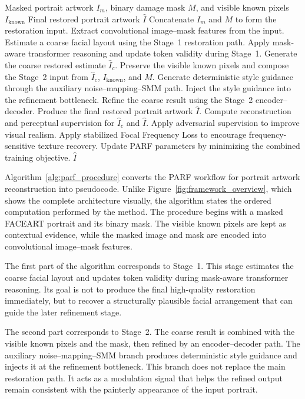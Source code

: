 \documentclass[12pt, twoside]{report}
\begin{document}
\begin{algorithm}[H]
\caption{PARF Inference and Training Procedure}
\label{alg:parf_procedure}
\begin{algorithmic}[1]
\Require Masked portrait artwork $I_m$, binary damage mask $M$, and visible known pixels $I_{\mathrm{known}}$
\Ensure Final restored portrait artwork $\hat{I}$
\State Concatenate $I_m$ and $M$ to form the restoration input.
\State Extract convolutional image--mask features from the input.
\State Estimate a coarse facial layout using the Stage~1 restoration path.
\State Apply mask-aware transformer reasoning and update token validity during Stage~1.
\State Generate the coarse restored estimate $\hat{I}_c$.
\State Preserve the visible known pixels and compose the Stage~2 input from $\hat{I}_c$, $I_{\mathrm{known}}$, and $M$.
\State Generate deterministic style guidance through the auxiliary noise--mapping--SMM path.
\State Inject the style guidance into the refinement bottleneck.
\State Refine the coarse result using the Stage~2 encoder--decoder.
\State Produce the final restored portrait artwork $\hat{I}$.
    \State Compute reconstruction and perceptual supervision for $\hat{I}_c$ and $\hat{I}$.
    \State Apply adversarial supervision to improve visual realism.
    \State Apply stabilized Focal Frequency Loss to encourage frequency-sensitive texture recovery.
    \State Update PARF parameters by minimizing the combined training objective.
\EndIf
\State \Return $\hat{I}$
\end{algorithmic}
\end{algorithm}

Algorithm~\ref{alg:parf_procedure} converts the PARF workflow for portrait artwork reconstruction into pseudocode. Unlike Figure~\ref{fig:framework_overview}, which shows the complete architecture visually, the algorithm states the ordered computation performed by the method. The procedure begins with a masked FACEART portrait and its binary mask. The visible known pixels are kept as contextual evidence, while the masked image and mask are encoded into convolutional image--mask features.

The first part of the algorithm corresponds to Stage~1. This stage estimates the coarse facial layout and updates token validity during mask-aware transformer reasoning. Its goal is not to produce the final high-quality restoration immediately, but to recover a structurally plausible facial arrangement that can guide the later refinement stage.

The second part corresponds to Stage~2. The coarse result is combined with the visible known pixels and the mask, then refined by an encoder--decoder path. The auxiliary noise--mapping--SMM branch produces deterministic style guidance and injects it at the refinement bottleneck. This branch does not replace the main restoration path. It acts as a modulation signal that helps the refined output remain consistent with the painterly appearance of the input portrait.
\end{document}
